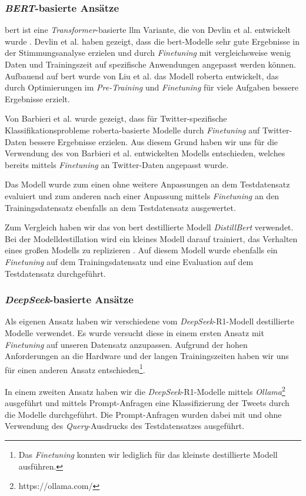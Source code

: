\subsubsection{\textit{BERT}-basierte Ansätze}\label{subsec:bert}

\gls{bert} ist eine \textit{Transformer}-basierte \gls{llm} Variante, die von Devlin et al. entwickelt wurde \cite{devlin2018bert}.
Devlin et al. haben gezeigt, dass die \gls{bert}-Modelle sehr gute Ergebnisse in der Stimmungsanalyse erzielen und durch \textit{Finetuning} mit vergleichsweise wenig Daten und Trainingszeit auf spezifische Anwendungen angepasst werden können.
Aufbauend auf \gls{bert} wurde von Liu et al. \cite{liu2019roberta} das Modell \gls{roberta} entwickelt, das durch Optimierungen im \textit{Pre-Training} und \textit{Finetuning} für viele Aufgaben bessere Ergebnisse erzielt.

Von Barbieri et al. \cite{barbieri2020tweeteval} wurde gezeigt, dass für Twitter-spezifische Klassifikationsprobleme \gls{roberta}-basierte Modelle durch \textit{Finetuning} auf Twitter-Daten bessere Ergebnisse erzielen.
Aus diesem Grund haben wir uns für die Verwendung des von Barbieri et al. entwickelten Modells entschieden, welches bereits mittels \textit{Finetuning} an Twitter-Daten angepasst wurde.

Das Modell wurde zum einen ohne weitere Anpassungen an dem Testdatensatz evaluiert und zum anderen nach einer Anpassung mittels \textit{Finetuning} an den Trainingsdatensatz ebenfalls an dem Testdatensatz ausgewertet.

Zum Vergleich haben wir das von \gls{bert} destillierte Modell \textit{DistillBert} \cite{sanh2019distilbert} verwendet.
Bei der Modelldestillation wird ein kleines Modell darauf trainiert, das Verhalten eines großen Modells zu replizieren \cite{sanh2019distilbert}.
Auf diesem Modell wurde ebenfalls ein \textit{Finetuning} auf dem Trainingsdatensatz und eine Evaluation auf dem Testdatensatz durchgeführt.


\subsubsection{\textit{DeepSeek}-basierte Ansätze}\label{subsec:deepseek}

Als eigenen Ansatz haben wir verschiedene vom \textit{DeepSeek}-R1-Modell destillierte Modelle \cite{deepseekai2025deepseekr1incentivizingreasoningcapability} verwendet.
Es wurde versucht diese in einem ersten Ansatz mit \textit{Finetuning} auf unseren Datensatz anzupassen.
Aufgrund der hohen Anforderungen an die Hardware und der langen Trainingszeiten haben wir uns für einen anderen Ansatz entschieden\footnote{Das \textit{Finetuning} konnten wir lediglich für das kleinste destillierte Modell ausführen.}.

In einem zweiten Ansatz haben wir die \textit{DeepSeek}-R1-Modelle mittels \textit{Ollama}\footnote{https://ollama.com/} ausgeführt und mittels Prompt-Anfragen eine Klassifizierung der Tweets durch die Modelle durchgeführt.
Die Prompt-Anfragen wurden dabei mit und ohne Verwendung des \textit{Query}-Ausdrucks des Testdatensatzes ausgeführt.
